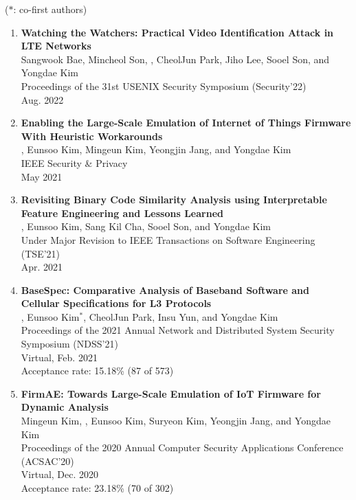 \clearpage
($\ast$: co-first authors)
\begin{enumerate}[leftmargin=1.5em]
    \item \textbf{Watching the Watchers: Practical Video Identification Attack
        in LTE Networks} \\
        {\small
            Sangwook Bae, Mincheol Son, , CheolJun Park, Jiho Lee, Sooel Son, and Yongdae Kim \\
            Proceedings of the 31st USENIX Security Symposium (Security'22) \\
            Aug. 2022
        }

    \item \textbf{Enabling the Large-Scale Emulation of Internet of Things
        Firmware With Heuristic Workarounds} \\
        {\small
            , Eunsoo Kim, Mingeun Kim, Yeongjin Jang, and Yongdae Kim \\
            IEEE Security \& Privacy \\
            May 2021
        }

    \item \textbf{Revisiting Binary Code Similarity Analysis using Interpretable Feature Engineering and Lessons Learned} \\
        {\small
            , Eunsoo Kim, Sang Kil Cha, Sooel Son, and Yongdae Kim \\
            Under Major Revision to IEEE Transactions on Software Engineering
            (TSE'21) \\
            Apr. 2021
        }

    \item \textbf{BaseSpec: Comparative Analysis of Baseband Software and Cellular Specifications for L3 Protocols} \\
        {\small
            , Eunsoo Kim$^\ast$, CheolJun Park, Insu Yun, and Yongdae Kim \\
            Proceedings of the 2021 Annual Network and Distributed System Security Symposium (NDSS'21) \\
            Virtual, Feb. 2021 \\
            Acceptance rate: 15.18\% (87 of 573)
        }

    \item \textbf{FirmAE: Towards Large-Scale Emulation of IoT Firmware for Dynamic Analysis} \\
        {\small
            Mingeun Kim, , Eunsoo Kim, Suryeon Kim, Yeongjin Jang, and Yongdae Kim \\
            Proceedings of the 2020 Annual Computer Security Applications Conference (ACSAC'20)\\
            Virtual, Dec. 2020 \\
            Acceptance rate: 23.18\% (70 of 302)
        }


\end{enumerate}

